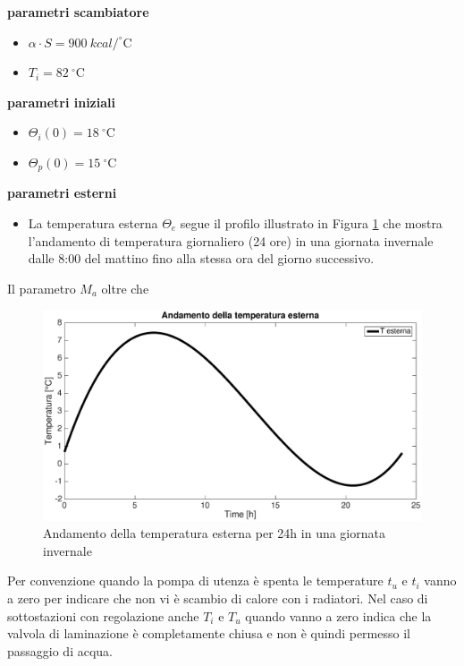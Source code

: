 \documentclass[laurea,oneside,11pt]{USiena_tesiLM}
\begin{document}
\textbf{parametri scambiatore}
\begin{itemize}
\item[]$\alpha \cdot S = 900 \ kcal / ^{\circ}$C
\item[]$T_i = 82 \ ^{\circ}$C
\end{itemize}

\textbf{parametri iniziali}
\begin{itemize}
\item[]$\Theta_i(0) = 18 \ ^{\circ}$C
\item[]$\Theta_p(0) = 15 \ ^{\circ}$C
\end{itemize}

\textbf{parametri esterni}
\begin{itemize}
\item[] La temperatura esterna $\Theta_e$ segue il profilo illustrato in Figura \ref{fig:temp_est} che mostra l'andamento di temperatura giornaliero (24 ore) in una giornata invernale dalle 8:00 del mattino fino alla stessa ora del giorno successivo. 
\end{itemize}

Il parametro $M_a$ oltre che

\begin{figure}[!h]
\centering
\includegraphics[width=\textwidth]{figure/temp_est} 
\caption{Andamento della temperatura esterna per 24h in una giornata invernale}
\label{fig:temp_est}
\end{figure}

Per convenzione quando la pompa di utenza è spenta le temperature $t_u$ e $t_i$ vanno a zero per indicare che non vi è scambio di calore con i radiatori. Nel caso di sottostazioni con regolazione anche $T_i$ e $T_u$ quando vanno a zero indica che la valvola di laminazione è completamente chiusa e non è quindi permesso il passaggio di acqua. 
\end{document}
